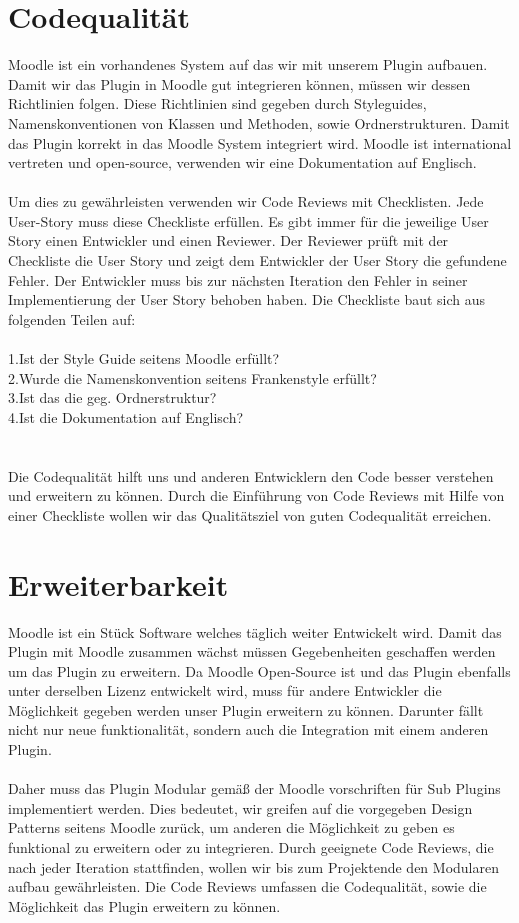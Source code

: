 \documentclass[accentcolor=tud0b,12pt,paper=a4]{tudreport}
\begin{document}
        \section{Codequalität}
Moodle ist ein vorhandenes System auf das wir mit unserem Plugin aufbauen. Damit wir das Plugin in Moodle gut integrieren können, müssen wir dessen Richtlinien folgen. Diese Richtlinien sind gegeben durch Styleguides, Namenskonventionen von Klassen und Methoden, sowie Ordnerstrukturen. Damit das Plugin korrekt in das Moodle System integriert wird. Moodle ist international vertreten und open-source, verwenden wir eine Dokumentation auf Englisch.
\\
\\
Um dies zu gewährleisten verwenden wir Code Reviews mit Checklisten. Jede User-Story muss diese Checkliste erfüllen. Es gibt immer für die jeweilige User Story einen Entwickler und einen Reviewer. Der Reviewer prüft mit der Checkliste die User Story und zeigt dem Entwickler der User Story die gefundene Fehler. Der Entwickler muss bis zur nächsten Iteration den Fehler in seiner Implementierung der User Story behoben haben. 
Die Checkliste baut sich aus folgenden Teilen auf:
\\
\\
1.Ist der Style Guide seitens Moodle erfüllt?\\
2.Wurde die Namenskonvention seitens Frankenstyle erfüllt?\\
3.Ist das die geg. Ordnerstruktur?\\
4.Ist die Dokumentation auf Englisch?\\
\\
\\
Die Codequalität hilft uns und anderen Entwicklern den Code besser verstehen und  
erweitern zu können. Durch die Einführung von Code Reviews mit Hilfe von einer Checkliste wollen wir das Qualitätsziel von guten Codequalität erreichen.
        
		\section{Erweiterbarkeit}
Moodle ist ein Stück Software welches täglich weiter Entwickelt wird. Damit das Plugin mit  
Moodle zusammen wächst müssen Gegebenheiten geschaffen werden um das Plugin zu erweitern. Da Moodle Open-Source ist und das Plugin ebenfalls unter derselben Lizenz entwickelt wird, muss für andere Entwickler die Möglichkeit gegeben werden unser Plugin erweitern zu können. Darunter fällt nicht nur neue funktionalität, sondern auch die Integration mit einem anderen Plugin.
\\
\\
Daher muss das Plugin Modular gemäß der Moodle vorschriften für Sub Plugins  implementiert werden. Dies bedeutet, wir greifen auf die vorgegeben Design Patterns seitens Moodle zurück, um anderen die Möglichkeit zu geben es funktional zu erweitern oder zu integrieren. Durch geeignete Code Reviews, die nach jeder Iteration stattfinden, wollen wir bis zum Projektende den Modularen aufbau gewährleisten. Die Code Reviews umfassen die Codequalität, sowie die Möglichkeit das Plugin erweitern zu können.
	
\end{document}

